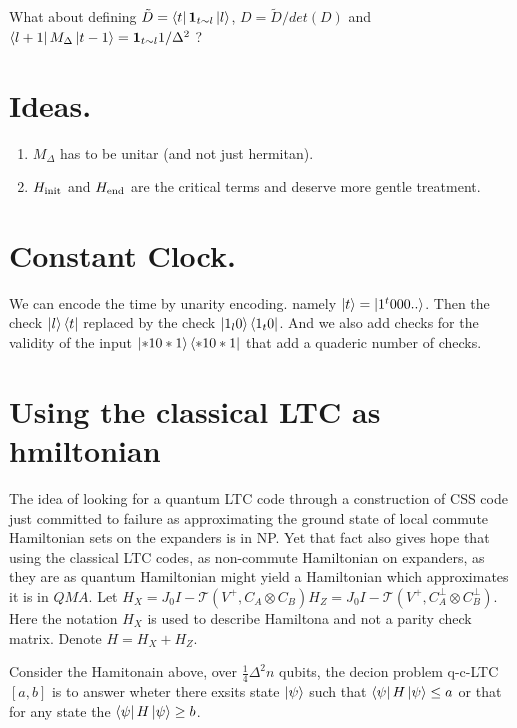 \documentclass[manuscript,screen,review]{acmart}
\begin{document}
What about defining $\tilde{D} = \bra{t} \mathbf{1}_{t\sim l} \ket{l} $, $D = \tilde{D}/det(D)$ and $\bra{l+1} M_{\Delta} \ket{t-1}  =  \mathbf{1}_{t\sim l} 1/\Delta^{2}$ ?  

\section{Ideas.}
\begin{enumerate}
  \item $M_{\Delta}$ has to be unitar (and not just hermitan).  
  \item $H_{\text{init}}$ and $H_{\text{end}}$ are the critical terms and deserve more gentle treatment.
\end{enumerate}


\section{Constant Clock.}

We can encode the time by unarity encoding. namely $\ket{t} = \ket{1^{t}000..}$. Then the check $\ket{l}\bra{t}$ replaced by the check $\ket{1_{l}0}\bra{1_{t}0}$.  And we also add checks for the validity of the input $ \ket{*10*1}\bra{*10*1} $ that add a quaderic number of checks.  

\section{Using the classical LTC as hmiltonian} 
The idea of looking for a quantum LTC code through a construction of CSS code just committed to failure as approximating the ground state of local commute Hamiltonian sets on the expanders is in NP. Yet that fact also gives hope that using the classical LTC codes, as non-commute Hamiltonian on expanders, as they are as quantum Hamiltonian might yield a Hamiltonian which approximates it is in $QMA$. Let $H_{X} = J_{0}I - \mathcal{T} ( V^{+}, C_{A}\otimes C_{B}) $$H_{Z} = J_{0}I -   \mathcal{T} ( V^{+}, C_{A}^{\perp}\otimes C_{B}^{\perp}) $. Here the notation $H_{X}$ is used to describe Hamiltona and not a parity check matrix.  Denote $H = H_{X} + H_{Z}$.

\begin{definition}
  Consider the Hamitonain above, over $\frac{1}{4}\Delta^{2}n$ qubits, the decion problem q-c-LTC$[a,b]$ is to answer wheter there exsits state $\ket{\psi}$ such that $\bra{\psi}H\ket{\psi} \le a $ or that for any state the $\bra{\psi}H\ket{\psi} \ge  b $. 
\end{definition}
\end{document}
